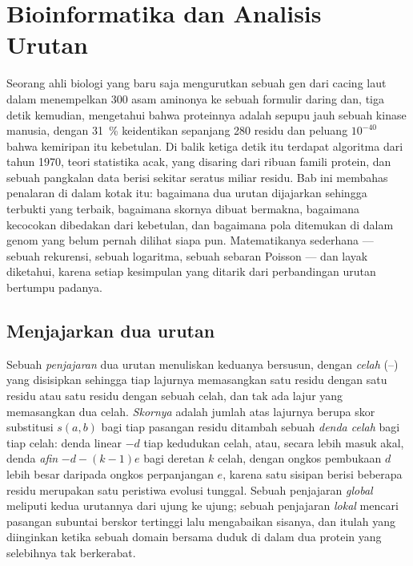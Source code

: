 \chapter{Bioinformatika dan Analisis Urutan}\label{ch:b3:bioinformatics}

Seorang ahli biologi yang baru saja mengurutkan sebuah gen dari cacing laut
dalam menempelkan \num{300} asam aminonya ke sebuah formulir daring dan, tiga
detik kemudian, mengetahui bahwa proteinnya adalah sepupu jauh sebuah kinase
manusia, dengan \qty{31}{\%} keidentikan sepanjang \num{280} residu dan
peluang $10^{-40}$ bahwa kemiripan itu kebetulan. Di balik ketiga detik itu
terdapat algoritma  dari tahun 1970, teori statistika
 acak,  yang disaring dari ribuan famili protein,
dan sebuah pangkalan data berisi sekitar seratus miliar residu. Bab ini
membahas penalaran di dalam kotak itu: bagaimana dua urutan dijajarkan
sehingga  terbukti yang terbaik, bagaimana skornya dibuat
bermakna, bagaimana kecocokan dibedakan dari kebetulan, dan bagaimana pola
ditemukan di dalam genom yang belum pernah dilihat siapa pun. Matematikanya
sederhana --- sebuah rekurensi, sebuah logaritma, sebuah sebaran Poisson ---
dan layak diketahui, karena setiap kesimpulan yang ditarik dari perbandingan
urutan bertumpu padanya.

\section{Menjajarkan dua urutan}

\begin{definition}\label{def:b3:bioinformatics:alignment}
%
Sebuah \emph{penjajaran} dua urutan menuliskan keduanya bersusun, dengan
\emph{celah} (--) yang disisipkan sehingga tiap lajurnya memasangkan satu
residu dengan satu residu atau satu residu dengan sebuah celah, dan tak ada
lajur yang memasangkan dua celah. \emph{Skornya} adalah jumlah atas lajurnya
berupa skor substitusi $s(a,b)$ bagi tiap pasangan residu ditambah sebuah
\emph{denda celah} bagi tiap celah: denda linear $-d$ tiap kedudukan celah,
atau, secara lebih masuk akal, denda \emph{afin} $-d - (k-1)e$ bagi deretan
$k$ celah, dengan ongkos pembukaan $d$ lebih besar daripada ongkos perpanjangan
$e$, karena satu sisipan berisi beberapa residu merupakan satu peristiwa
evolusi tunggal. Sebuah penjajaran \emph{global} meliputi kedua urutannya
dari ujung ke ujung; sebuah penjajaran \emph{lokal} mencari pasangan
subuntai berskor tertinggi lalu mengabaikan sisanya, dan itulah yang
diinginkan ketika sebuah domain bersama duduk di dalam dua protein yang
selebihnya tak berkerabat.
\end{definition}

